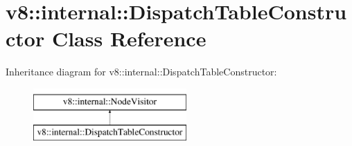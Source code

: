 \hypertarget{classv8_1_1internal_1_1DispatchTableConstructor}{}\section{v8\+:\+:internal\+:\+:Dispatch\+Table\+Constructor Class Reference}
\label{classv8_1_1internal_1_1DispatchTableConstructor}
Inheritance diagram for v8\+:\+:internal\+:\+:Dispatch\+Table\+Constructor\+:\begin{figure}[H]
\begin{center}
\leavevmode
\includegraphics[height=2.000000cm]{classv8_1_1internal_1_1DispatchTableConstructor}
\end{center}
\end{figure}
